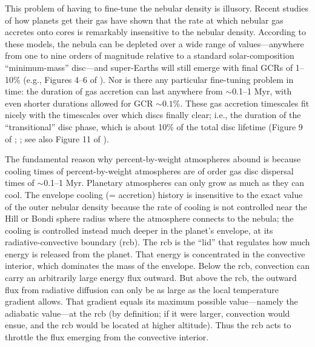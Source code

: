 \documentclass[fleqn,useAMS,usenatbib]{mnras}
\begin{document}
This problem of having to fine-tune
the nebular density is illusory.
Recent studies of how planets get their gas
\citep{paper1,paper2,paper3,ginzburg16} have shown that
the rate at which nebular gas accretes onto cores is 
remarkably insensitive to the nebular density. 
According to these
models, the nebula can be depleted
over a wide range of values---anywhere from one to nine
orders of magnitude
relative to a standard solar-composition ``minimum-mass'' disc---and
super-Earths will still emerge with final GCRs
of 1--10\% (e.g., Figures 4--6 of \citealt{paper3}).
Nor is there any particular fine-tuning problem in time:
the duration of gas accretion can last anywhere from
$\sim$0.1--1 Myr, with even shorter durations allowed
for GCR $\sim 0.1$\%. 
These gas accretion timescales fit nicely
with the timescales over which discs
finally clear; i.e., the duration of the ``transitional'' disc
phase, which is about 10\% of the total disc lifetime 
(Figure 9 of \citealt{owen11}; \citealt{alexander14};
see also Figure 11 of \citealt{espaillat14}).

The fundamental reason why percent-by-weight atmospheres
abound is because cooling times of percent-by-weight atmospheres 
are of order gas disc dispersal times of $\sim$0.1--1 Myr.
Planetary atmospheres can only grow as much as they can cool.
The envelope cooling (= accretion) history is insensitive to the
exact value
of the outer nebular density because the rate of cooling is not controlled
near the Hill or Bondi sphere radius where the atmosphere connects to the
nebula; the cooling is controlled
instead much deeper in the planet's envelope, at its radiative-convective
boundary (rcb).
The rcb is the ``lid'' that regulates how much energy is released
from the planet. That energy is concentrated
in the convective interior, which
dominates the mass of the envelope.
Below the rcb, convection can carry an arbitrarily large energy flux outward.
But above the rcb, the outward flux from radiative diffusion can only be 
as large as the local temperature gradient allows. That gradient equals
its maximum possible value---namely the adiabatic value---at the rcb
(by definition; if it were larger, convection would
ensue, and the rcb would be located at higher altitude).
Thus the rcb acts to throttle
the flux emerging from the convective interior.
\end{document}
